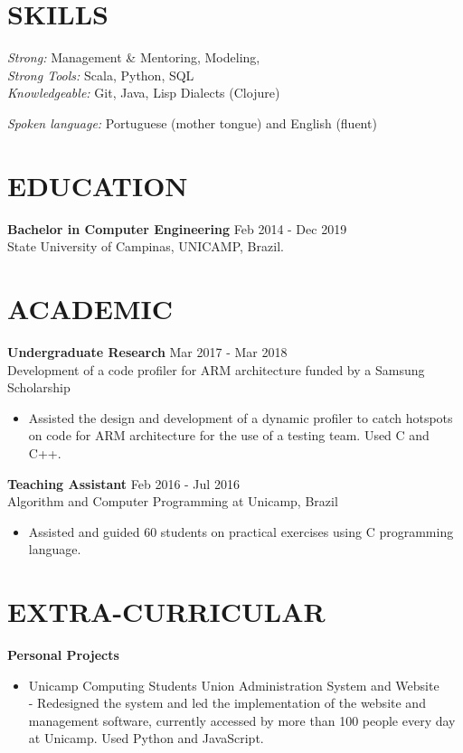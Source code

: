 \documentclass[margin, 10pt]{res} %
\begin{document}
\begin{resume}
\section{SKILLS}
{\sl Strong:} Management \& Mentoring, Modeling,  \\
{\sl Strong Tools:} Scala, Python, SQL \\
{\sl Knowledgeable:} Git, Java, Lisp Dialects (Clojure) 

{\sl Spoken language:} Portuguese (mother tongue) and English (fluent)

\section{EDUCATION}

{\bf Bachelor in Computer Engineering} \hfill Feb 2014 - Dec 2019 \\
State University of Campinas, UNICAMP, Brazil.

\section{ACADEMIC}

{\bf Undergraduate Research} \hfill Mar 2017 - Mar 2018 \\
Development of a code profiler for ARM architecture funded by a Samsung Scholarship \
\begin{itemize} \itemsep -1pt %
\item Assisted the design and development of a dynamic profiler to catch hotspots on code for ARM architecture for the use of a testing team. Used C and C++.
\end{itemize}
{\bf Teaching Assistant} \hfill Feb 2016 - Jul 2016 \\
Algorithm and Computer Programming at Unicamp, Brazil \
\begin{itemize} \itemsep -1pt %
\item Assisted and guided 60 students on practical exercises using C programming language.
\end{itemize}

\section{EXTRA-CURRICULAR}
{\bf Personal Projects}
\begin{itemize} \itemsep -1pt %
\item Unicamp Computing Students Union Administration System and Website\\
	 - Redesigned the system and led the implementation of the website and management software, currently accessed by more than 100 people every day at Unicamp. Used Python and JavaScript.


\end{itemize}
\end{resume}
\end{document}
